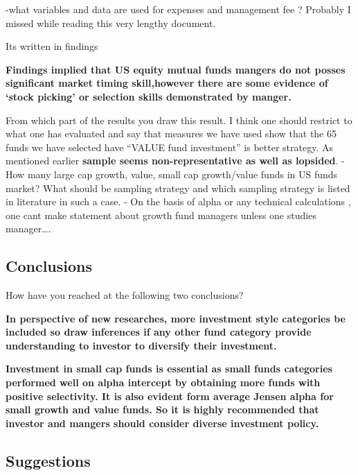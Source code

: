 \documentclass[]{tufte-handout}
\begin{document}
-what variables and data are used for expenses and management fee ?
Probably I missed while reading this very lengthy document.

Its written in findings

\textbf{Findings implied that US equity mutual funds mangers do not
posses significant market timing skill,however there are some evidence
of `stock picking' or selection skills demonstrated by manger.}

From which part of the results you draw this result. I think one should
restrict to what one has evaluated and say that measures we have used
show that the 65 funds we have selected have ``VALUE fund investment''
is better strategy. As mentioned earlier \textbf{sample seems
non-representative as well as lopsided}. - How many large cap growth,
value, small cap growth/value funds in US funds market? What should be
sampling strategy and which sampling strategy is listed in literature in
such a case. - On the basis of alpha or any technical calculations , one
cant make statement about growth fund managers unless one studies
manager\ldots.

\hypertarget{conclusions}{%
\subsection{Conclusions}\label{conclusions}}

How have you reached at the following two conclusions?

\textbf{In perspective of new researches, more investment style
categories be included so draw inferences if any other fund category
provide understanding to investor to diversify their investment.}

\textbf{Investment in small cap funds is essential as small funds
categories performed well on alpha intercept by obtaining more funds
with positive selectivity. It is also evident form average Jensen alpha
for small growth and value funds. So it is highly recommended that
investor and mangers should consider diverse investment policy.}

\hypertarget{suggestions}{%
\subsection{Suggestions}\label{suggestions}}
\end{document}
